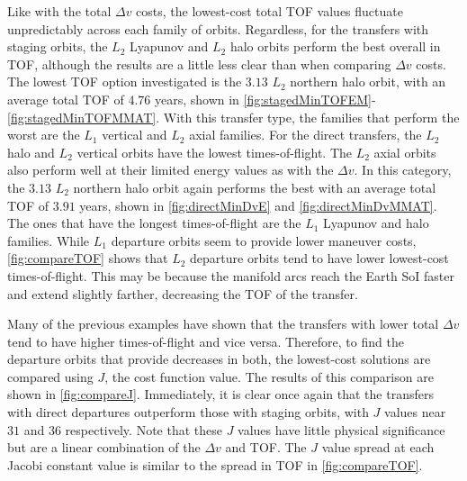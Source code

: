Like with the total $\Delta v$ costs, the lowest-cost total TOF values fluctuate unpredictably
across each family of orbits. Regardless, for the transfers with staging orbits, the $L_{2}$
Lyapunov and $L_{2}$ halo orbits perform the best overall in TOF, although the results are a little
less clear than when comparing $\Delta v$ costs. The lowest TOF option investigated is the $3.13$
$L_{2}$ northern halo orbit, with an average total TOF of $4.76$ years, shown in
\cref{fig:stagedMinTOFEM}-\cref{fig:stagedMinTOFMMAT}. With this transfer type, the families that
perform the worst are the $L_{1}$ vertical and $L_{2}$ axial families. For the direct transfers,
the $L_{2}$ halo and $L_{2}$ vertical orbits have the lowest times-of-flight. The $L_{2}$ axial
orbits also perform well at their limited energy values as with the $\Delta v$. In this category,
the $3.13$ $L_{2}$ northern halo orbit again performs the best with an average total TOF of $3.91$
years, shown in \cref{fig:directMinDvE} and \cref{fig:directMinDvMMAT}. The ones that have the
longest times-of-flight are the $L_{1}$ Lyapunov and halo families. While $L_{1}$ departure orbits seem to
provide lower maneuver costs, \cref{fig:compareTOF} shows that $L_{2}$ departure orbits tend to
have lower lowest-cost times-of-flight. This may be because the manifold arcs reach the Earth SoI
faster and extend slightly farther, decreasing the TOF of the transfer.

Many of the previous examples have shown that the transfers with lower total $\Delta v$ tend to
have higher times-of-flight and vice versa. Therefore, to find the departure orbits that provide
decreases in both, the lowest-cost solutions are compared using $J$, the cost function value. The
results of this comparison are shown in \cref{fig:compareJ}. Immediately, it is clear once again
that the transfers with direct departures outperform those with staging orbits, with $J$ values
near $31$ and $36$ respectively. Note that these $J$ values have little physical significance but
are a linear combination of the $\Delta v$ and TOF. The $J$ value spread at each Jacobi constant
value is similar to the spread in TOF in \cref{fig:compareTOF}.

